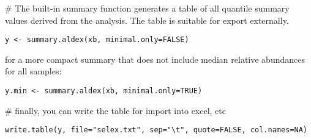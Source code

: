 \documentclass[11pt]{amsart}
\begin{document}
\noindent\#  The built-in summary function generates a table of all quantile summary values derived from the analysis. The table is suitable for export externally. \\

\noindent\begin{verbatim}y <- summary.aldex(xb, minimal.only=FALSE)\end{verbatim}
for a more compact summary that does not include median relative abundances for all samples:\\
\noindent\begin{verbatim}y.min <- summary.aldex(xb, minimal.only=TRUE)\end{verbatim}

\noindent\# finally, you can write the table for import into excel, etc\\
\begin{verbatim}write.table(y, file="selex.txt", sep="\t", quote=FALSE, col.names=NA)\end{verbatim}
\end{document}
